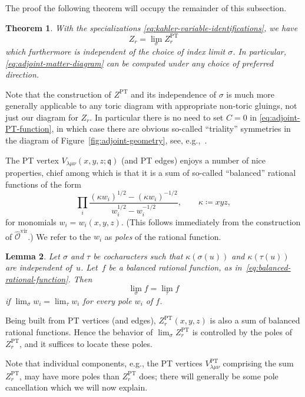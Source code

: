 \documentclass[10pt,a4paper]{amsart}
\numberwithin{equation}{section}
\newtheorem{Theorem}{Theorem}[section]
\newtheorem{Lemma}[Theorem]{Lemma}
\renewcommand{\hat}[1]{\widehat{#1}}
\newcommand{\cO}{\mathcal{O}}
\newcommand{\fq}{\mathfrak{q}}
\newcommand{\vir}{\mathrm{vir}}
\DeclareMathOperator{\PT}{PT}
\begin{document}
\begin{MyParagraph} The proof the following theorem
will occupy the remainder of this subsection.
\begin{Theorem} \label{thm:adjoint-matter-independence-of-preferred-direction}
 With the specializations \eqref{eq:kahler-variable-identifications},
 we have
 \[ Z_r = \lim_\sigma Z_r^{\PT} \]
 which furthermore is independent of the choice of index limit
 $\sigma$. In particular, \eqref{eq:adjoint-matter-diagram} can be
 computed under {\it any} choice of preferred direction.
\end{Theorem}

 Note that the
construction of $Z^{\PT}$ and its independence of $\sigma$ is much
more generally applicable to any toric diagram with appropriate
non-toric gluings, not just our diagram for $Z_r$. In particular there
is no need to set $C=0$ in \eqref{eq:adjoint-PT-function}, in which
case there are obvious so-called ``triality'' symmetries in the
diagram of Figure~\ref{fig:adjoint-geometry}, see, e.g.,~\cite{Bastian2018}.
\end{MyParagraph}

\begin{MyParagraph}
The PT vertex $V_{\lambda\mu\nu}(x,y,z;\fq)$ (and PT edges) enjoys a
number of nice properties, chief among which is that it is a sum of
so-called ``balanced'' rational functions of the form
\begin{equation} \label{eq:balanced-rational-function}
 \prod_i \frac{(\kappa w_i)^{1/2} - (\kappa w_i)^{-1/2}}{w_i^{1/2} - w_i^{-1/2}}, \qquad \kappa \coloneqq xyz,
\end{equation}
for monomials $w_i = w_i(x,y,z)$. (This follows immediately from the
construction of $\hat\cO^{\vir}$.) We refer to the $w_i$ as {\it
 poles} of the rational function.

\begin{Lemma} \label{lem:index-limits-of-balanced-functions}
 Let $\sigma$ and $\tau$ be cocharacters such that
 $\kappa(\sigma(u))$ and $\kappa(\tau(u))$ are independent of~$u$.
 Let~$f$ be a balanced rational function, as in~\eqref{eq:balanced-rational-function}. Then
 \[ \lim_\sigma f = \lim_\tau f \]
 if $\lim_\sigma w_i = \lim_\tau w_i$ for every pole $w_i$ of $f$.
\end{Lemma}

Being built from PT vertices (and edges), $Z_r^{\PT}(x,y,z)$ is also a
sum of balanced rational functions. Hence the behavior of
$\lim_\sigma Z_r^{\PT}$ is controlled by the poles of $Z_r^{\PT}$, and
it suffices to locate these poles.

Note that individual components, e.g., the PT vertices
$V_{\lambda\mu\nu}^{\PT}$ comprising the sum $Z_r^{\PT}$, may have
more poles than $Z_r^{\PT}$ does; there will generally be some pole
cancellation which we will now explain.
\end{MyParagraph}
\end{document}
